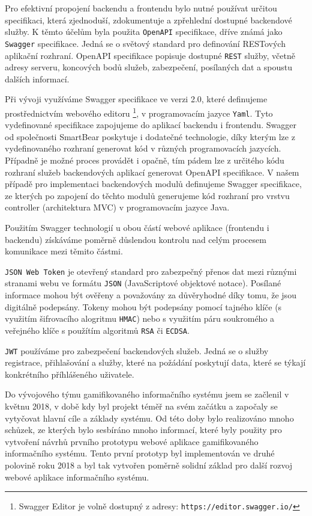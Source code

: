 \documentclass[twoside, 12pt]{article}
\begin{document}
{Pro efektivní propojení backendu a frontendu bylo nutné používat určitou specifikaci,
která zjednoduší, zdokumentuje a zpřehlední dostupné backendové služby.
K těmto účelům byla použita \texttt{OpenAPI} specifikace, dříve známá jako \texttt{Swagger} specifikace.
Jedná se o světový standard pro definování RESTových aplikační rozhraní.
OpenAPI specifikace popisuje dostupné \texttt{REST} služby, včetně adresy serveru,
koncových bodů služeb, zabezpečení, posílaných dat a spoustu dalších informací.
\par
Při vývoji využíváme Swagger specifikace ve verzi 2.0, které definujeme prostřednictvím
webového editoru
\footnote{Swagger Editor je volně dostupný z adresy: \texttt{https://editor.swagger.io/}},
v programovacím jazyce \texttt{Yaml}.
Tyto vydefinované specifikace zapojujeme do aplikací backendu i frontendu.
Swagger od společnosti SmartBear poskytuje i dodatečné technologie,
díky kterým lze z vydefinovaného rozhraní generovat kód v různých programovacích jazycích.
Případně je možné proces provádět i opačně, tím pádem lze z určitého kódu
rozhraní služeb backendových aplikací generovat OpenAPI specifikace.
V našem případě pro implementaci backendových modulů definujeme Swagger specifikace,
ze kterých po zapojení do těchto modulů generujeme kód rozhraní pro vrstvu controller
(architektura MVC) v programovacím jazyce Java.
\par
Použitím Swagger technologií u obou částí webové aplikace (frontendu i backendu)
získáváme poměrně důslendou kontrolu nad celým procesem komunikace mezi těmito částmi.

\texttt{JSON Web Token} je otevřený standard pro zabezpečný přenos dat
mezi různými stranami webu ve formátu \texttt{JSON} (JavaScriptové objektové notace).
Posílané informace mohou být ověřeny a považovány za důvěryhodné
díky tomu, že jsou digitálně podepsány. Tokeny mohou být podepsány
pomocí tajného klíče (s využitím šifrovacího alogritmu \texttt{HMAC}) nebo
s využitím páru soukromého a veřejného klíče s použítím algoritmů \texttt{RSA} či \texttt{ECDSA}.
\cite{jwt}
\par
\texttt{JWT} používáme pro zabezpečení backendových služeb.
Jedná se o služby registrace, přihlašování a služby, které na požádání poskytují
data, které se týkají konkrétního příhlášeného uživatele.



Do vývojového týmu gamifikovaného informačního systému jsem se začlenil v květnu 2018,
v době kdy byl projekt téměř na svém začátku a započaly se vytyčovat hlavní cíle a základy systému.
Od této doby bylo realizováno mnoho schůzek, ze kterých bylo sesbíráno mnoho informací,
které byly použity pro vytvoření návrhů prvního prototypu webové aplikace gamifikovaného informačního systému.
Tento první prototyp byl implementován ve druhé polovině roku 2018 a byl tak vytvořen poměrně solidní základ
pro další rozvoj webové aplikace informačního systému.

}
\end{document}

